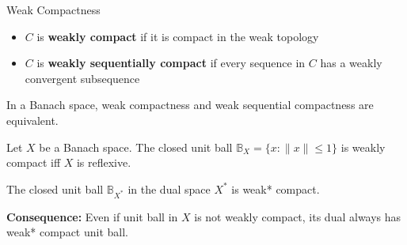 \documentclass[aspectratio=169,10pt]{beamer}
\begin{document}
\begin{frame}{Weak Compactness}
  \begin{definition}
    \begin{itemize}
      \item $C$ is \textbf{weakly compact} if it is compact in the weak topology
      \item $C$ is \textbf{weakly sequentially compact} if every sequence in $C$ has a weakly convergent subsequence
    \end{itemize}
  \end{definition}

  \vspace{0.3cm}
  \begin{theorem}
    In a Banach space, weak compactness and weak sequential compactness are equivalent.
  \end{theorem}

  \vspace{0.3cm}
  \begin{theorem}
    Let $X$ be a Banach space. The closed unit ball $\mathbb{B}_X = \{x : \|x\| \leq 1\}$ is weakly compact iff $X$ is reflexive.
  \end{theorem}

  \vspace{0.3cm}
  \begin{theorem}
    The closed unit ball $\mathbb{B}_{X^*}$ in the dual space $X^*$ is weak* compact.
  \end{theorem}

  \vspace{0.3cm}
  \textbf{Consequence:} Even if unit ball in $X$ is not weakly compact, its dual always has weak* compact unit ball.
\end{frame}
\end{document}
